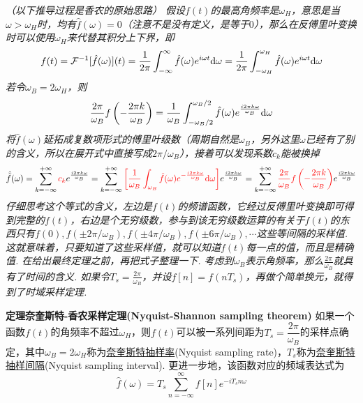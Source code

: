 \documentclass[UTF8]{ctexart}
\newcommand{\trm}[1]{{\rm #1}}
\newenvironment{theorem}[1]
    {\begin{tcolorbox}[enhanced, colback=LightYellow, breakable=true, frame hidden, borderline west={1.5mm}{-2mm}{DarkBlue}]
    {\bfseries {\color{DarkBlue} 定理}\quad #1} \newline}
    {\end{tcolorbox}}
\begin{document}
\textit{
\noindent（以下推导过程是香农的原始思路）
\newline
假设\(f(t)\)的最高角频率是\(\omega_H\)，意思是当\(\omega > \omega_H\)时，均有\(\hat{f}(\omega)=0\)（注意不是没有定义，是等于\(0\)），那么在反傅里叶变换时可以使用\(\omega_H\)来代替其积分上下界，即
\[f(t) = \mathcal{F}^{-1}[\hat{f}(\omega)](t) = \frac{1}{2\pi}\int_{-\infty}^{\infty}\hat{f}(\omega)e^{i\omega t}\trm{d}\omega = \frac{1}{2\pi}\int_{-\omega_H}^{\omega_H}\hat{f}(\omega)e^{i\omega t}\trm{d}\omega\]
若令\(\omega_B=2\omega_H\)，则
\[\frac{2\pi}{\omega_B}f\left(-\frac{2\pi k}{\omega_B}\right) = \frac{1}{\omega_B}\int_{-\omega_B/2}^{\omega_B/2}\hat{f}(\omega)e^{\frac{i2\pi k\omega}{\omega_B}}\trm{d}\omega\]
将\(\hat{f}(\omega)\)延拓成复数项形式的傅里叶级数（周期自然是\(\omega_B\)，另外这里\(\omega\)已经有了别的含义，所以在展开式中直接写成\(2\pi/\omega_B\)），接着可以发现系数\(c_k\)能被换掉
\[ \hat{\tilde{f}}(\omega) = \sum_{k=-\infty}^{+\infty}{\color{red} c_k}e^{\frac{i2\pi k\omega}{\omega_B}} 
= \sum_{k=-\infty}^{+\infty} {\color{red} \left[\frac{1}{\omega_B} \int_{\omega_B}\hat{f}(\omega)e^{-\frac{i2\pi k\omega}{\omega_B}}\trm{d}\omega\right]}e^{\frac{i2\pi k\omega}{\omega_B}} 
= \sum_{k=-\infty}^{+\infty} {\color{red} \frac{2\pi}{\omega_B}f\left(-\frac{2\pi k}{\omega_B}\right)}e^{\frac{i2\pi k\omega}{\omega_B}}\]
仔细思考这个等式的含义，左边是\(f(t)\)的频谱函数，它经过反傅里叶变换即可得到完整的\(f(t)\)，右边是个无穷级数，参与到该无穷级数运算的有关于\(f(t)\)的东西只有\(f(0), f(\pm 2\pi/\omega_B), f(\pm 4\pi/\omega_B), f(\pm 6\pi/\omega_B), \cdots\)这些等间隔的采样值. 这就意味着，只要知道了这些采样值，就可以知道\(f(t)\)每一点的值，而且是精确值.
\newline
在给出最终定理之前，再把式子整理一下. 考虑到\(\omega_B\)表示角频率，那么\(\displaystyle{\frac{2\pi}{\omega_B}}\)就具有了时间的含义. 如果令\(\displaystyle{T_s=\frac{2\pi}{\omega_B}}\)，并设\(\displaystyle{f[n]=f(nT_s)}\)，再做个简单换元，就得到了时域采样定理.
}

\begin{theorem}{奈奎斯特-香农采样定理(Nyquist-Shannon sampling theorem)}
    如果一个函数\(f(t)\)的角频率不超过\(\omega_H\)，则\(f(t)\)可以被一系列间距为\(T_s=\dfrac{2\pi}{\omega_B}\)的采样点确定，其中\(\omega_B=2\omega_H\)称为\uline{奈奎斯特抽样率}(Nyquist sampling rate)，\(T_s\)称为\uline{奈奎斯特抽样间隔}(Nyquist sampling interval). 更进一步地，该函数对应的频域表达式为
    \[\hat{f}(\omega) = T_s \sum_{n=-\infty}^{\infty}f[n]e^{-iT_sn\omega}\]
\end{theorem}
\end{document}
